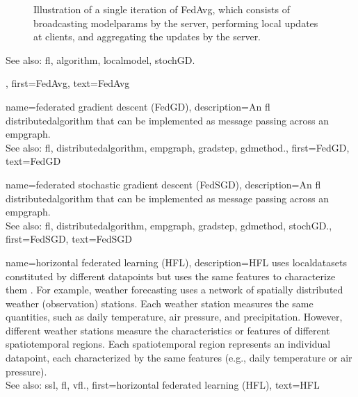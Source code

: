 {{\begin{figure}[H]
\begin{center}
			\end{center}
			\caption{Illustration of a single iteration of FedAvg, which consists of broadcasting \glspl{modelparam} by the 
			server, performing local updates at clients, and aggregating the updates by the server. 
			\label{fig_single_iteration_fedavg_dict}} 
		\end{figure} 
		See also: \gls{fl}, \gls{algorithm}, \gls{localmodel}, \gls{stochGD}.},
	first={FedAvg},
	text={FedAvg}
} 

{name={federated gradient descent (FedGD)},
	description={An \gls{fl} \gls{distributedalgorithm} that 
		can be implemented as message passing across an \gls{empgraph}. 
		\\ 
		See also: \gls{fl}, \gls{distributedalgorithm}, \gls{empgraph}, \gls{gradstep}, \gls{gdmethod}.},
	first={FedGD},
	text={FedGD}
} 

{name={federated stochastic gradient descent (FedSGD)},
	description={An \gls{fl} \gls{distributedalgorithm} that 
		can be implemented as message passing across an \gls{empgraph}. 
		\\ 
		See also: \gls{fl}, \gls{distributedalgorithm}, \gls{empgraph}, \gls{gradstep}, \gls{gdmethod}, \gls{stochGD}.},
	first={FedSGD},
	text={FedSGD}
} 

{name={horizontal federated learning (HFL)},
	description={HFL uses \glspl{localdataset} constitut\-ed by different
	   	\glspl{datapoint} but uses the same \glspl{feature} to characterize them \cite{HFLChapter2020}.
		For example, weather forecasting uses a network of spatially distributed
		weather (observation) stations. Each weather station measures the
		same quantities, such as daily temperature, air pressure, and precipitation.
		However, different weather stations measure the characteristics or
		\glspl{feature} of different spatiotemporal regions. Each spatiotemporal region 
		represents an individual \gls{datapoint}, each characterized by the same \glspl{feature} 
		(e.g., daily temperature or air pressure).\\
		See also: \gls{ssl}, \gls{fl}, \gls{vfl}.},
	first={horizontal federated learning (HFL)},
	text={HFL}
} 

